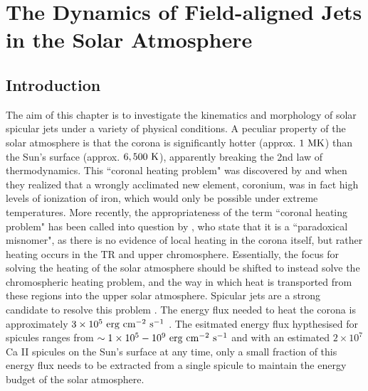 \chapter{The Dynamics of Field-aligned Jets in the Solar Atmosphere}
\label{chap:sj}
\let\thefootnote\relax{}
\section{Introduction}
\label{sec:c2intro}
The aim of this chapter is to investigate the kinematics and morphology of solar spicular jets under a variety of physical conditions. A peculiar property of the solar atmosphere is that the corona is significantly hotter (approx. $1~\rm{MK}$) than the Sun's surface (approx. $6,500~\rm{K}$), apparently breaking the 2nd law of thermodynamics. This ``coronal heating problem" was discovered by \cite{Grotrian1939} and \cite{Edl1943} when they realized that a wrongly acclimated new element, coronium, was in fact high levels of ionization of iron, which would only be possible under extreme temperatures. More recently, the appropriateness of the term ``coronal heating problem" has been called into question by \cite{Aschwanden2007ApJ}, who state that it is a ``paradoxical misnomer", as there is no evidence of local heating in the corona itself, but rather heating occurs in the TR and upper chromosphere. Essentially, the focus for solving the heating of the solar atmosphere should be shifted to instead solve the chromospheric heating problem, and the way in which heat is transported from these regions into the upper solar atmosphere. Spicular jets are a strong candidate to resolve this problem \citep{Kudoh1999ApJ514493K, Pontieu2007PASJ, Martinez-Sykora2017,Moore2011ApJ731L18M, Pontieu2017ApJ, Samanta2019Sci, Zuo2019AcASn, Bale2019Natur}. The energy flux needed to heat the corona is approximately $3\times10^{5}~\rm{erg~cm^{-2}~s^{-1}}$ \citep{Withbroe1977ARAA15363W}. The esitmated energy flux hypthesised for spicules ranges from $\sim 1\times10^5-10^9~\rm{erg~cm^{-2}~s^{-1}}$  \citep{Athay1982ApJ255743A,Zaqarashvili_2009SSRv,Pontieu2011Sci} and with an estimated $2 \times 10^{7}$ \citep{Judge_2010ApJ} Ca II spicules on the Sun's surface at any time, only a small fraction of this energy flux needs to be extracted from a single spicule to maintain the energy budget of the solar atmosphere. \np
